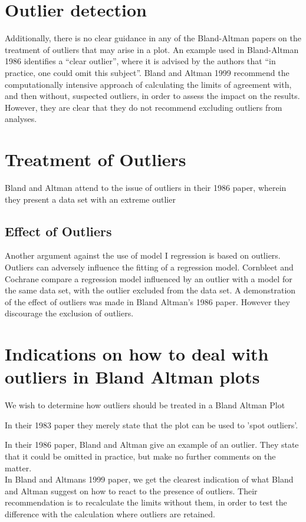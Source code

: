 \documentclass[Main.tex]{subfiles}
\begin{document}
\section{Outlier detection}
Additionally, there is no clear guidance in any of the Bland-Altman papers on the treatment of outliers that may arise in a plot.
An example used in Bland-Altman 1986 identifies a “clear outlier”, where it is advised by the authors that “in practice, one could omit this subject”.
Bland and Altman 1999 recommend the computationally intensive approach of calculating the limits of agreement with, and then without, suspected outliers, in order to assess the impact on the results. However, they are clear that they do not recommend excluding outliers from analyses.



\section{Treatment of Outliers}
Bland and Altman attend to the issue of outliers in their 1986
paper, wherein they present a data set with an extreme outlier


	\subsection{Effect of Outliers} Another argument against
	the use of model I regression is based on outliers. Outliers can
	adversely influence the fitting of a regression model. Cornbleet
	and Cochrane compare a regression model influenced by an outlier
	with a model for the same data set, with the outlier excluded from
	the data set. A demonstration of the effect of outliers was made
	in Bland Altman's 1986 paper. However they discourage the
	exclusion of outliers.
	
	\section{Indications on how to deal with outliers in Bland Altman plots}
	
	We wish to determine how outliers should be treated in a Bland
	Altman Plot
	
	In their 1983 paper they merely state that the plot can be used to
	'spot outliers'.
	
	In  their 1986 paper, Bland and Altman give an example of an
	outlier. They state that it could be omitted in practice, but make
	no further comments on the matter.
	\\
	In Bland and Altmans 1999 paper, we get the clearest indication of
	what Bland and Altman suggest on how to react to the presence of
	outliers. Their recommendation is to recalculate the limits
	without them, in order to test the difference with the calculation
	where outliers are retained.\\
	
\end{document}
